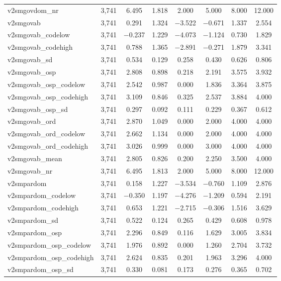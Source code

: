 \begin{table}[!htbp]
\begin{tabular}{@{\extracolsep{5pt}}lccccccc}
v2smgovdom\_nr & 3,741 & 6.495 & 1.818 & 2.000 & 5.000 & 8.000 & 12.000 \\ 
v2smgovab & 3,741 & 0.291 & 1.324 & $-$3.522 & $-$0.671 & 1.337 & 2.554 \\ 
v2smgovab\_codelow & 3,741 & $-$0.237 & 1.229 & $-$4.073 & $-$1.124 & 0.730 & 1.829 \\ 
v2smgovab\_codehigh & 3,741 & 0.788 & 1.365 & $-$2.891 & $-$0.271 & 1.879 & 3.341 \\ 
v2smgovab\_sd & 3,741 & 0.534 & 0.129 & 0.258 & 0.430 & 0.626 & 0.806 \\ 
v2smgovab\_osp & 3,741 & 2.808 & 0.898 & 0.218 & 2.191 & 3.575 & 3.932 \\ 
v2smgovab\_osp\_codelow & 3,741 & 2.542 & 0.987 & 0.000 & 1.836 & 3.364 & 3.875 \\ 
v2smgovab\_osp\_codehigh & 3,741 & 3.109 & 0.846 & 0.325 & 2.537 & 3.884 & 4.000 \\ 
v2smgovab\_osp\_sd & 3,741 & 0.297 & 0.092 & 0.111 & 0.229 & 0.367 & 0.612 \\ 
v2smgovab\_ord & 3,741 & 2.870 & 1.049 & 0.000 & 2.000 & 4.000 & 4.000 \\ 
v2smgovab\_ord\_codelow & 3,741 & 2.662 & 1.134 & 0.000 & 2.000 & 4.000 & 4.000 \\ 
v2smgovab\_ord\_codehigh & 3,741 & 3.026 & 0.999 & 0.000 & 3.000 & 4.000 & 4.000 \\ 
v2smgovab\_mean & 3,741 & 2.805 & 0.826 & 0.200 & 2.250 & 3.500 & 4.000 \\ 
v2smgovab\_nr & 3,741 & 6.495 & 1.813 & 2.000 & 5.000 & 8.000 & 12.000 \\ 
v2smpardom & 3,741 & 0.158 & 1.227 & $-$3.534 & $-$0.760 & 1.109 & 2.876 \\ 
v2smpardom\_codelow & 3,741 & $-$0.350 & 1.197 & $-$4.276 & $-$1.209 & 0.594 & 2.191 \\ 
v2smpardom\_codehigh & 3,741 & 0.653 & 1.221 & $-$2.715 & $-$0.306 & 1.516 & 3.629 \\ 
v2smpardom\_sd & 3,741 & 0.522 & 0.124 & 0.265 & 0.429 & 0.608 & 0.978 \\ 
v2smpardom\_osp & 3,741 & 2.296 & 0.849 & 0.116 & 1.629 & 3.005 & 3.834 \\ 
v2smpardom\_osp\_codelow & 3,741 & 1.976 & 0.892 & 0.000 & 1.260 & 2.704 & 3.732 \\ 
v2smpardom\_osp\_codehigh & 3,741 & 2.624 & 0.835 & 0.201 & 1.963 & 3.296 & 4.000 \\ 
v2smpardom\_osp\_sd & 3,741 & 0.330 & 0.081 & 0.173 & 0.276 & 0.365 & 0.702 \\ 

\end{tabular}
\end{table}
